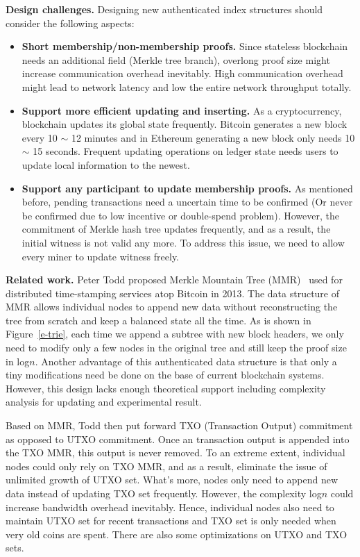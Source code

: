 \documentclass[conference]{IEEEtran}
\begin{document}
\textbf{Design challenges.} 
Designing new authenticated index structures should consider the following aspects:

\begin{itemize}
  \item \textbf{Short membership/non-membership proofs.} 
  Since stateless blockchain needs an additional field (Merkle tree branch), overlong proof size might increase communication overhead inevitably.
  High communication overhead might lead to network latency and low the entire network throughput totally.
  \item \textbf{Support more efficient updating and inserting.}
  As a cryptocurrency, blockchain updates its global state frequently. Bitcoin generates a new block every 10 $\sim$ 12 minutes and in Ethereum generating a new block only needs 10 $\sim$ 15 seconds.
  Frequent updating operations on ledger state needs users to update local information to the newest.
  \item \textbf{Support any participant to update membership proofs.}
  As mentioned before, pending transactions need a uncertain time to be confirmed (Or never be confirmed due to low incentive or double-spend problem).
  However, the commitment of Merkle hash tree updates frequently, and as a result, the initial witness is not valid any more.
  To address this issue, we need to allow every miner to update witness freely.
\end{itemize}

\textbf{Related work.}
Peter Todd proposed Merkle Mountain Tree (MMR)~\cite{Tod} used for distributed time-stamping services atop Bitcoin in 2013. 
%
The data structure of MMR allows individual nodes to append new data without reconstructing the tree from scratch and keep a balanced state all the time.
%
As is shown in Figure~\ref{e-trie}, each time we append a subtree with new block headers, we only need to modify only a few nodes in the original tree and still keep the proof size in log\(n\).
%
Another advantage of this authenticated data structure is that only a tiny modifications need be done on the base of current blockchain systems.
%
However, this design lacks enough theoretical support including complexity analysis for updating and experimental result.

Based on MMR, Todd then put forward TXO (Transaction Output) commitment as opposed to UTXO commitment.
%
Once an transaction output is appended into the TXO MMR, this output is never removed.
%
To an extreme extent, individual nodes could only rely on TXO MMR, and as a result, eliminate the issue of unlimited growth of UTXO set.
%
What's more, nodes only need to append new data instead of updating TXO set frequently.
%
However, the complexity log\(n\) could increase bandwidth overhead inevitably.
%
Hence, individual nodes also need to maintain UTXO set for recent transactions and TXO set is only needed when very old coins are spent.
%
There are also some optimizations on UTXO and TXO sets.
\end{document}
